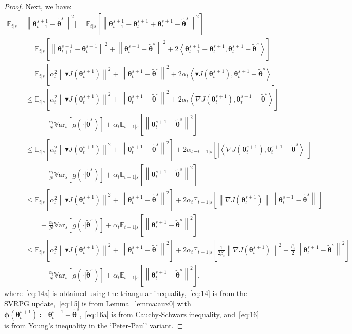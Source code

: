 \documentclass{article}
\theoremstyle{remark}
\theoremstyle{definition}
\newcommand{\norm}[2][\infty]{\left\|#2\right\|_{#1}}
\newcommand{\dotprod}[2]{\left\langle#1,#2\right\rangle}
\newcommand{\vtheta}{\boldsymbol{\theta}}
\newcommand{\vphi}{\boldsymbol{\phi}}
\newcommand{\gradJ}[1]{\nabla J(#1)}
\newcommand{\Ets}[2][t]{\mathbb{E}_{#1\vert s}\left[#2\right]}
\newcommand{\Vars}[1]{{\mathbb{V}\text{ar}}_{s}\left[#1\right]}
\newcommand{\gradBlack}[1]{\blacktriangledown J(#1)}
\newcommand{\wt}[1]{\widetilde{#1}}
\begin{document}
\begin{proof}
Next, we have:
\begingroup
\allowdisplaybreaks
\begin{align}
        \mathbb{E}_{t|s}\bigg[ & \norm[]{\vtheta_{t+1}^{s+1}-\wt{\vtheta}^s}^2 \bigg]
= \Ets{\norm[]{\vtheta_{t+1}^{s+1}- \vtheta_t^{s+1} + \vtheta_t^{s+1}-\wt{\vtheta}^s}^2} \nonumber\\
&=\Ets{\norm[]{\vtheta_{t+1}^{s+1}-\vtheta_{t}^{s+1}}^2+\norm[]{\vtheta_t^{s+1}-\wt{\vtheta}^s}^2+2\dotprod{\vtheta_{t+1}^{s+1}-\vtheta_{t}^{s+1}}{\vtheta_t^{s+1}-\wt{\vtheta}^s}} \label{eq:14a} \\
&= \Ets{\alpha_t^2\norm[]{\gradBlack{\vtheta_t^{s+1}}}^2+\norm[]{\vtheta_t^{s+1}-\wt{\vtheta}^s}^2+2\alpha_t\dotprod{\gradBlack{\vtheta_t^{s+1}}}{\vtheta_t^{s+1}-\wt{\vtheta}^s}} \label{eq:14}\\
&\leq \Ets{\alpha_t^2\norm[]{\gradBlack{\vtheta_t^{s+1}}}^2+\norm[]{\vtheta_t^{s+1}-\wt{\vtheta}^s}^2+2\alpha_t\dotprod{\gradJ{\vtheta_t^{s+1}}}{\vtheta_t^{s+1}-\wt{\vtheta}^s}} \nonumber\\ 
&\qquad+
\frac{\alpha_t}{N}\Vars{g(\cdot\vert\wt{\vtheta}^s)} +\alpha_t\Ets[t-1]{\norm[]{\vtheta_t^{s+1}-\wt{\vtheta}^s}^2} \label{eq:15}\\
%
&\leq \Ets{\alpha_t^2\norm[]{\gradBlack{\vtheta_t^{s+1}}}^2+\norm[]{\vtheta_t^{s+1}-\wt{\vtheta}^s}^2}
+2\alpha_t\Ets[t-1]{\left|\dotprod{\gradJ{\vtheta_t^{s+1}}}{\vtheta_t^{s+1}-\wt{\vtheta}^s}\right|} \nonumber\\ 
&\qquad+
\frac{\alpha_t}{N}\Vars{g(\cdot\vert\wt{\vtheta}^s)} +\alpha_t\Ets[t-1]{\norm[]{\vtheta_t^{s+1}-\wt{\vtheta}^s}^2} \nonumber\\
%
&\leq \Ets{\alpha_t^2\norm[]{\gradBlack{\vtheta_t^{s+1}}}^2+\norm[]{\vtheta_t^{s+1}-\wt{\vtheta}^s}^2}
+2\alpha_t\Ets[t-1]{\norm[]{\gradJ{\vtheta_t^{s+1}}}\norm[]{\vtheta_t^{s+1}-\wt{\vtheta}^s}} \nonumber\\ 
&\qquad+
\frac{\alpha_t}{N}\Vars{g(\cdot\vert\wt{\vtheta}^s)} +\alpha_t\Ets[t-1]{\norm[]{\vtheta_t^{s+1}-\wt{\vtheta}^s}^2} \nonumber\\
%
&\leq \Ets{\alpha_t^2\norm[]{\gradBlack{\vtheta_t^{s+1}}}^2+\norm[]{\vtheta_t^{s+1}-\wt{\vtheta}^s}^2}
+2\alpha_t\Ets[t-1]{\frac{1}{2\beta_t}\norm[]{\gradJ{\vtheta_t^{s+1}}}^2+\frac{\beta_t}{2}\norm[]{\vtheta_t^{s+1}-\wt{\vtheta}^s}^2} \label{eq:16a}\\ 
&\qquad
+\frac{\alpha_t}{N}\Vars{g(\cdot\vert\wt{\vtheta}^s)} +\alpha_t\Ets[t-1]{\norm[]{\vtheta_t^{s+1}-\wt{\vtheta}^s}^2}, \label{eq:16}
\end{align}
\endgroup
where~\eqref{eq:14a} is obtained using the triangular inequality,~\eqref{eq:14} is from the SVRPG update,~\eqref{eq:15} is from Lemma~\ref{lemma:aux0} with $\vphi(\vtheta_t^{s+1})\coloneqq\vtheta_t^{s+1}-\tilde{\vtheta}^s$,~\eqref{eq:16a} is from Cauchy-Schwarz inequality, and~\eqref{eq:16} is from Young's inequality in the `Peter-Paul' variant.

\end{proof}
\end{document}
